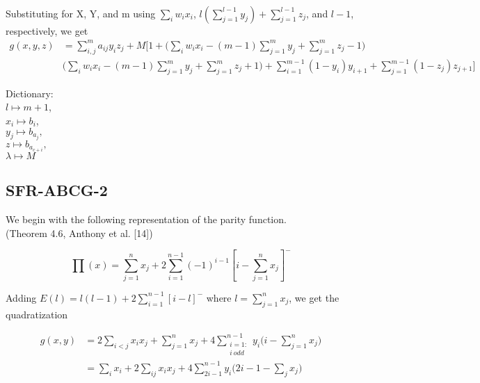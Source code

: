 \documentclass[a4paper,11pt]{article}
\begin{document}
\noindent \\Substituting for X, Y, and m using $\sum_i w_ix_i$, $l\left(\sum_{j=1}^{l-1}y_j\right) + \sum_{j=1}^{l-1} z_j$, and $l-1$, respectively, we get
\begin{equation}
  \begin{split}
  \left.
  g(x,y,z)
  \right.
  &= \sum_{i,j}^{m}a_{ij}y_iz_j + M\Big[1 + \Big(\sum_i w_ix_i-(m-1)\sum_{j=1}^{m}y_j + \sum_{j=1}^{m} z_j-1\Big)\\
  &\Big(\sum_i w_ix_i-(m-1)\sum_{j=1}^{m}y_j + \sum_{j=1}^{m} z_j+1\Big)
  + \sum_{i=1}^{m-1}(1-y_i)y_{i+1} + \sum_{j=1}^{m-1}(1-z_j)z_{j+1}\Big]
  \end{split}
\end{equation}

Dictionary: \\
$l\mapsto m + 1$,\\
$x_i\mapsto b_i$, \\
$y_j\mapsto b_{a_j},$\\
$z\mapsto b_{a_{c+i}},$\\
$\lambda\mapsto M$


\subsection{SFR-ABCG-2}

We begin with the following representation of the parity function.
\\(Theorem 4.6, Anthony et al. [14])

\begin{equation}
  \prod{(x)} = \sum_{j=1}^n x_j + 2\sum_{i=1}^{n-1}(-1)^{i-1}\left[i - \sum_{j=1}^{n}x_j\right]^-
\end{equation}

\noindent Adding $E(l) = l(l-1) + 2\sum_{i=1}^{n-1}\left[i-l\right]^-$ where $l = \sum_{j=1}^n x_j$, we get the quadratization

\begin{equation}
\begin{split}
  \left.
  g(x,y)
  \right.
  &= 2\sum_{i<j}x_ix_j + \sum_{j=1}^n x_j + 4\sum_{\substack{i = 1:\\ i\:odd}}^{n-1}y_i\Big(i - \sum_{j=1}^n x_j\Big)\\
  &= \sum_{i}x_i + 2\sum_{ij}x_ix_j + 4\sum_{2i-1}^{n-1}y_i\Big(2i - 1 - \sum_{j}x_j\Big)
  \end{split}
\end{equation}
\end{document}
